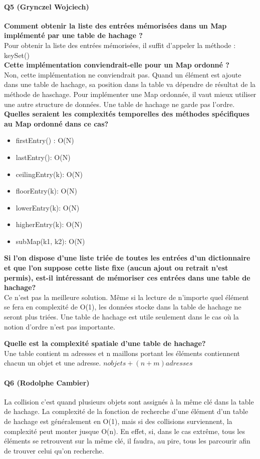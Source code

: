 \documentclass[a4paper]{article}
\begin{document}
\paragraph{Q5 (Grynczel Wojciech)} 
\textbf{Comment obtenir la liste des entrées mémorisées dans un Map implémenté par une table de hachage ?}\\
Pour obtenir la liste des entrées mémorisées, il suffit d'appeler la méthode : keySet()\\
\textbf{Cette implémentation conviendrait-elle pour un Map ordonné ?}\\
Non, cette implémentation ne conviendrait pas. Quand un élément est ajoute dans une table de hachage,  sa position dans la table va dépendre de résultat de la méthode de haschage. Pour implémenter une Map ordonnée, il vaut mieux utiliser une autre structure de données.
Une table de hachage ne garde pas l'ordre.\\  
\textbf{Quelles seraient les complexités temporelles des méthodes spécifiques au Map ordonné dans ce cas?}\\
\begin{itemize}
	\item firstEntry() : O(N)
	\item lastEntry(): O(N)
	\item ceilingEntry(k): O(N)
	\item floorEntry(k): O(N)
	\item lowerEntry(k): O(N)
	\item higherEntry(k): O(N)
	\item subMap(k1, k2): O(N)
\end{itemize}

\textbf{Si l'on dispose d'une liste triée de toutes les entrées d'un dictionnaire et que l'on suppose cette liste fixe (aucun ajout ou retrait n'est permis), est-il intéressant de mémoriser ces entrées dans une table de hachage?}\\
Ce n’est pas la meilleure solution. Même si la lecture de n’importe quel élément se fera en complexité de O(1), les données stocke dans la table de hachage ne seront plus triées.  
Une table de hachage est utile seulement dans le cas où la notion d’ordre n’est pas importante.

\textbf{ Quelle est la complexité spatiale d’une table de hachage?}\\
Une table contient m adresses et n maillons portant les éléments contiennent chacun un objet et une adresse.
$ n objets + (n + m) adresses $

\paragraph{Q6 (Rodolphe Cambier)}
La collision c'est quand plusieurs objets sont assignés à la même clé dans la table de hachage. La complexité de la fonction de recherche d'une élément d'un table de hachage est généralement en O(1), mais si des collisions surviennent, la complexité peut monter jusque O(n). En effet, si, dans le cas extrême, tous les éléments se retrouvent sur la même clé, il faudra, au pire, tous les parcourir afin de trouver celui qu'on recherche. 
\end{document}
